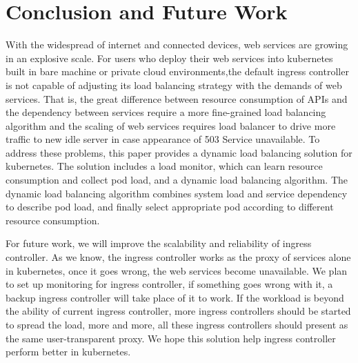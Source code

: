 \section{Conclusion and Future Work}
\label{sec:conclusion}

With the widespread of internet and connected devices, web services are growing in an explosive scale. For users who deploy their web services into kubernetes built in bare machine or private cloud environments,the default ingress controller is not capable of adjusting its load balancing strategy with the demands of web services. That is, the great difference between resource consumption of APIs and the dependency between services require a more fine-grained load balancing algorithm and the scaling of web services requires load balancer to drive more traffic to new idle server in case appearance of 503 Service unavailable. To address these problems, this paper provides a dynamic load balancing solution for kubernetes. The solution includes a load monitor, which can learn resource consumption and collect pod load, and a dynamic load balancing algorithm. The dynamic load balancing algorithm combines system load and service dependency to describe pod load, and finally select appropriate pod according to different resource consumption.

For future work, we will improve the scalability and reliability of ingress controller.  As we know, the ingress controller works as the proxy of services alone in kubernetes, once it goes wrong, the web services become unavailable. We plan to set up monitoring for ingress controller, if something goes wrong with it, a backup ingress controller will take place of it to work. If the workload is beyond the ability of current ingress controller, more ingress controllers should be started to spread the load, more and more, all these ingress controllers should present as the same user-transparent proxy. We hope this solution help ingress controller perform better in kubernetes.
